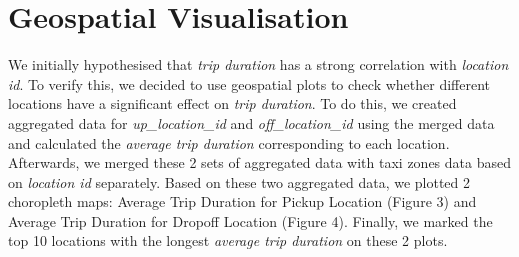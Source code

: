 \documentclass[11pt]{article}
\begin{document}
\section{Geospatial Visualisation}

We initially hypothesised that \textit{trip duration} has a strong correlation with \textit{location id}. To verify this, we decided to use geospatial plots to check whether different locations have a significant effect on \textit{trip duration}. To do this, we created aggregated data for \textit{up\_location\_id} and \textit{off\_location\_id} using the merged data and calculated the \textit{average trip duration} corresponding to each location. Afterwards, we merged these 2 sets of aggregated data with taxi zones data based on \textit{location id} separately. Based on these two aggregated data, we plotted 2 choropleth maps: Average Trip Duration for Pickup Location (Figure 3) and Average Trip Duration for Dropoff Location (Figure 4). Finally, we marked the top 10 locations with the longest \textit{average trip duration} on these 2 plots.
\end{document}
